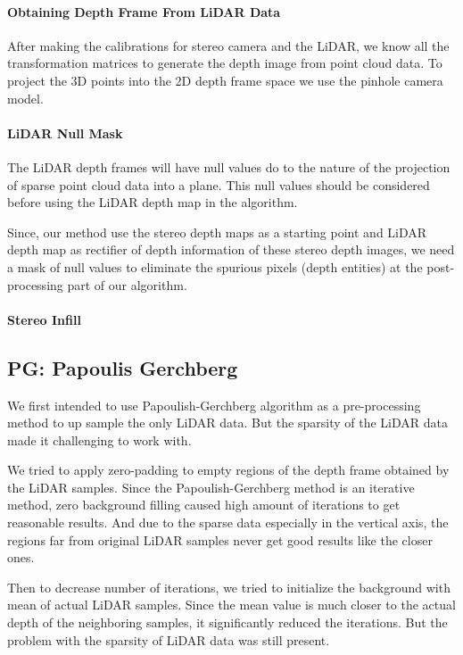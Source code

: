 \documentclass[conference]{IEEEtran}
\begin{document}
\paragraph{Obtaining Depth Frame From LiDAR Data}

After making the calibrations for stereo camera and the LiDAR, we know all the transformation matrices to generate the depth image from point cloud data. To project the 3D points into the 2D depth frame space we use the pinhole camera model. 

\paragraph{LiDAR Null Mask}

The LiDAR depth frames will have null values do to the nature of the projection of sparse point cloud data into a plane. This null values should be considered before using the LiDAR depth map in the algorithm.

Since, our method use the stereo depth maps as a starting point and LiDAR depth map as rectifier of depth information of these stereo depth images, we need a mask of null values to eliminate the spurious pixels (depth entities) at the post-processing part of our algorithm.

\paragraph{Stereo Infill}

\subsection{PG: Papoulis Gerchberg}
We first intended to use Papoulish-Gerchberg algorithm as a pre-processing method to up sample the only LiDAR data. But the sparsity of the LiDAR data made it challenging to work with.

We tried to apply zero-padding to empty regions of the depth frame obtained by the LiDAR samples. Since the Papoulish-Gerchberg method is an iterative method, zero background filling caused high amount of iterations to get reasonable results. And due to the sparse data especially in the vertical axis, the regions far from original LiDAR samples never get good results like the closer ones.

Then to decrease number of iterations, we tried to initialize the background with mean of actual LiDAR samples. Since the mean value is much closer to the actual depth of the neighboring samples, it significantly reduced the iterations. But the problem with the sparsity of LiDAR data was still present.
\end{document}

